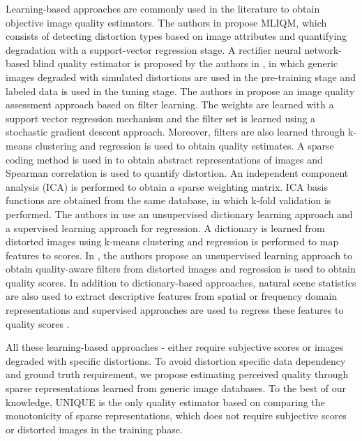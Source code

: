 \documentclass[draftcls,12pt, onecolumn]{IEEEtran}
\begin{document}
Learning-based approaches are commonly used in the literature to obtain objective image quality estimators. The authors in \cite{charrier2012} propose MLIQM, which consists of detecting distortion types based on image attributes and quantifying degradation with a support-vector regression stage. A rectifier neural network-based blind quality estimator is proposed by the authors in \cite{Tang2014}, in which generic images degraded with simulated distortions are used in the pre-training stage and labeled data is used in the tuning stage. The authors in \cite{Ye2013} propose an image quality assessment approach based on filter learning. The weights are learned with a support vector regression mechanism and the filter set is learned using a stochastic gradient descent approach. Moreover, filters are also learned through k-means clustering and regression is used to obtain quality estimates. A sparse coding method is used in \cite{chang2012} to obtain abstract representations of images and Spearman correlation is used to quantify distortion.  An independent component analysis (ICA) is performed to obtain a sparse weighting matrix. ICA basis functions are obtained from the same database, in which k-fold validation is performed. The authors in \cite{Ye2012} use an unsupervised dictionary learning approach and a supervised learning approach for regression. A dictionary is learned from distorted images using k-means clustering and regression is performed to map features to scores. In \cite{Gu2014}, the authors propose an unsupervised learning approach to obtain quality-aware filters from distorted images and regression is used to obtain quality scores. In addition to dictionary-based approaches, natural scene statistics are also  used to extract descriptive features from spatial or frequency domain representations and supervised approaches are used to regress these features to quality scores \cite{Mittal2012,Moorthy2010,Saad2012}.


 All these learning-based approaches \cite{charrier2012}-\cite{Saad2012} either require subjective scores or images degraded with specific distortions. To avoid distortion specific data dependency and ground truth requirement, we propose estimating perceived quality through sparse representations learned from generic image databases. To the best of our knowledge, UNIQUE is the only quality estimator based on comparing the monotonicity of sparse representations, which does not require subjective scores or distorted images in the training phase.
\end{document}

